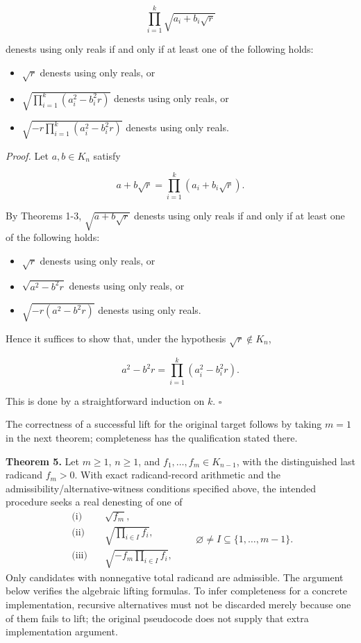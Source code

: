 \documentclass[11pt,letterpaper]{article}
\begin{document}
\[
\prod_{i=1}^{k} \sqrt{a_{i}+b_{i} \sqrt{r}}
\]

denests using only reals if and only if at least one of the following holds:

\begin{itemize}
  \item[(i)] $\sqrt{r}$ denests using only reals, or
  \item[(ii)] $\sqrt{\prod_{i=1}^k(a_i^2-b_i^2r)}$ denests using only reals, or
\end{itemize}

\begin{itemize}
  \item[(iii)] $\sqrt{-r\prod_{i=1}^k(a_i^2-b_i^2r)}$ denests using only reals.
\end{itemize}

\noindent\textit{Proof.} Let $a, b \in K_{n}$ satisfy

\[
a+b \sqrt{r}=\prod_{i=1}^{k}\left(a_{i}+b_{i} \sqrt{r}\right) .
\]

By Theorems 1-3, $\sqrt{a+b \sqrt{r}}$ denests using only reals if and only if at least one of the following holds:

\begin{itemize}
  \item[(i)] $\sqrt{r}$ denests using only reals, or
  \item[(ii)] $\sqrt{a^{2}-b^{2} r}$ denests using only reals, or
  \item[(iii)] $\sqrt{-r(a^2-b^2r)}$ denests using only reals.
\end{itemize}

Hence it suffices to show that, under the hypothesis $\sqrt{r} \notin K_{n}$,

\[
a^{2}-b^{2} r=\prod_{i=1}^{k}\left(a_{i}^{2}-b_{i}^{2} r\right) .
\]

This is done by a straightforward induction on $k$. \(\square\)

The correctness of a successful lift for the original target follows by taking $m=1$ in the next theorem; completeness has the qualification stated there.

\noindent\textbf{Theorem 5.} Let $m\geq1$, $n\geq1$, and $f_1,\ldots,f_m\in K_{n-1}$, with the distinguished last radicand $f_m>0$. With exact radicand-record arithmetic and the admissibility/alternative-witness conditions specified above, the intended procedure seeks a real denesting of one of
\begin{equation*}
\begin{aligned}
\text{(i)}\quad&\sqrt{f_m},\\
\text{(ii)}\quad&\sqrt{\prod_{i\in I}f_i},\\
\text{(iii)}\quad&\sqrt{-f_m\prod_{i\in I}f_i},
\end{aligned}\qquad
\varnothing\ne I\subseteq\{1,\ldots,m-1\}.
\end{equation*}
Only candidates with nonnegative total radicand are admissible. The argument below verifies the algebraic lifting formulas. To infer completeness for a concrete implementation, recursive alternatives must not be discarded merely because one of them fails to lift; the original pseudocode does not supply that extra implementation argument.
\end{document}
